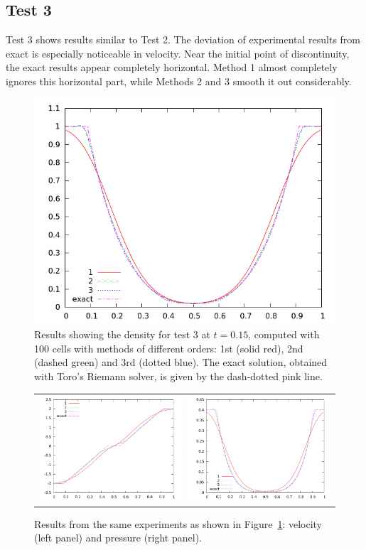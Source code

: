 \documentclass[10pt]{article}
\begin{document}
\subsection{Test 3}
Test 3 shows results similar to Test 2. The deviation of experimental results from exact is especially noticeable in velocity. Near the initial point of discontinuity, the exact results appear completely horizontal. Method 1 almost completely ignores this horizontal part, while Methods 2 and 3 smooth it out considerably. 
\begin{figure}[h]
  \begin{center}
     \includegraphics[width=.78\textwidth]{den_T3.png}	
  \end{center}
  \caption{Results showing the density for test 3 at $t=0.15$, computed with 100 cells with methods of different orders: 1st (solid red), 2nd (dashed green) and 3rd (dotted blue). The exact solution, obtained with Toro's Riemann solver, is given by the dash-dotted pink line.}
  \label{fig:den_T3}
\end{figure}

\begin{figure}
  \begin{center}
	\begin{tabular}{cc}
      \includegraphics[width=.425\textwidth]{vel_T3.png} &
	  \includegraphics[width=.425\textwidth]{prs_T3.png}
	\end{tabular}
  \end{center}
  \caption{Results from the same experiments as shown in Figure~\ref{fig:den_T3}:
  velocity (left panel) and pressure (right panel).}
\end{figure}
\end{document}
